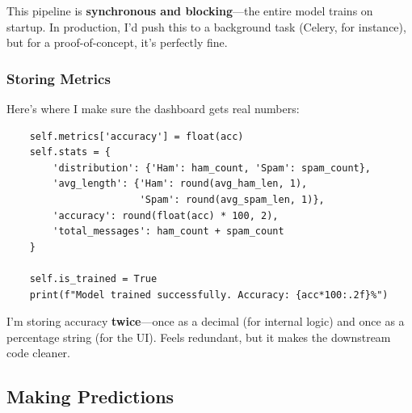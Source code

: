 \documentclass[12pt, a4paper]{article}
\begin{document}
\begin{highlight}
    This pipeline is \textbf{synchronous and blocking}—the entire model trains on startup. In production, I'd push this to a background task (Celery, for instance), but for a proof-of-concept, it's perfectly fine.
\end{highlight}

\subsubsection{Storing Metrics}

Here's where I make sure the dashboard gets real numbers:

\begin{verbatim}
    self.metrics['accuracy'] = float(acc)
    self.stats = {
        'distribution': {'Ham': ham_count, 'Spam': spam_count},
        'avg_length': {'Ham': round(avg_ham_len, 1), 
                       'Spam': round(avg_spam_len, 1)},
        'accuracy': round(float(acc) * 100, 2),
        'total_messages': ham_count + spam_count
    }
    
    self.is_trained = True
    print(f"Model trained successfully. Accuracy: {acc*100:.2f}%")
\end{verbatim}

\begin{techdetail}
    I'm storing accuracy \textbf{twice}—once as a decimal (for internal logic) and once as a percentage string (for the UI). Feels redundant, but it makes the downstream code cleaner.
\end{techdetail}

\subsection{Making Predictions}
\end{document}
